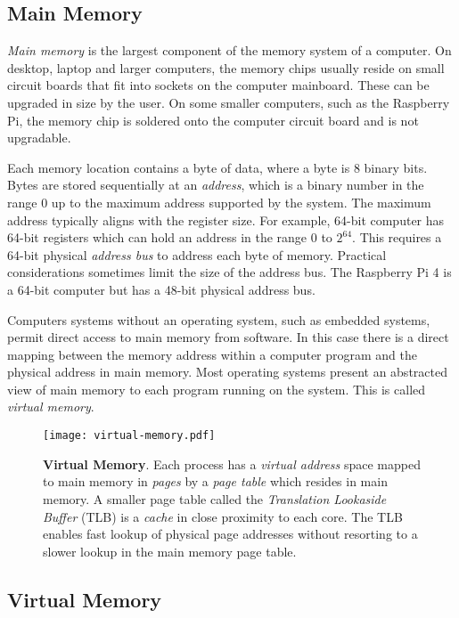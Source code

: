 \subsection{Main Memory}

\emph{Main memory} is the largest component of the memory system of a computer. On desktop, laptop and larger computers, the memory chips usually reside on small circuit boards that fit into sockets on the computer mainboard. These can be upgraded in size by the user. On some smaller computers, such as the Raspberry Pi, the memory chip is soldered onto the computer circuit board and is not upgradable.

Each memory location contains a byte of data, where a byte is 8 binary bits. Bytes are stored sequentially at an \emph{address}, which is a binary number in the range 0 up to the maximum address supported by the system. The maximum address typically aligns with the register size. For example, 64-bit computer has 64-bit registers which can hold an address in the range 0 to $2^{64}$. This requires a 64-bit physical \emph{address bus} to address each byte of memory. Practical considerations sometimes limit the size of the address bus. The Raspberry Pi 4 is a 64-bit computer but has a 48-bit physical address bus.

Computers systems without an operating system, such as embedded systems, permit direct access to main memory from software. In this case there is a direct mapping between the memory address within a computer program and the physical address in main memory. Most operating systems present an abstracted view of main memory to each program running on the system. This is called \emph{virtual memory}.
 
    
\begin{figure}
	\centering	
	\texttt{[image: virtual-memory.pdf]}
	\caption{\textbf{Virtual Memory}. Each process has a \emph{virtual address} space mapped to main memory in \emph{pages} by a \emph{page table} which resides in main memory. A smaller page table called the \emph{Translation Lookaside Buffer} (TLB) is a \emph{cache} in close proximity to each core. The TLB enables fast lookup of physical page addresses without resorting to a slower lookup in the main memory page table.}
\end{figure}


\subsection{Virtual Memory}

